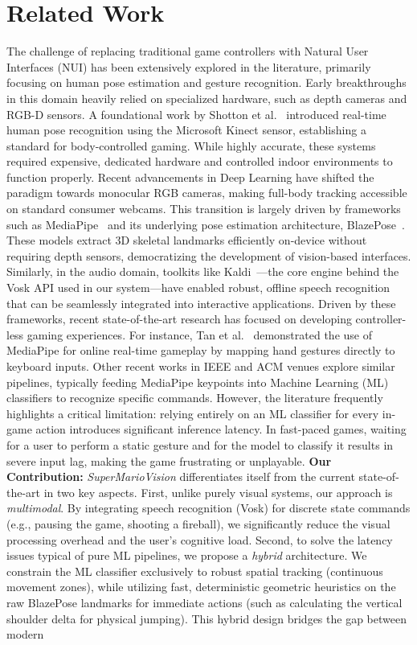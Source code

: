 \documentclass[10pt,twocolumn,a4paper]{article}
\begin{document}
	
	\section{Related Work}
	
	The challenge of replacing traditional game controllers with Natural User Interfaces (NUI) has been extensively explored in the literature, primarily focusing on human pose estimation and gesture recognition. Early breakthroughs in this domain heavily relied on specialized hardware, such as depth cameras and RGB-D sensors. A foundational work by Shotton et al.~\cite{shotton2011kinect} introduced real-time human pose recognition using the Microsoft Kinect sensor, establishing a standard for body-controlled gaming. While highly accurate, these systems required expensive, dedicated hardware and controlled indoor environments to function properly. Recent advancements in Deep Learning have shifted the paradigm towards monocular RGB cameras, making full-body tracking accessible on standard consumer webcams. This transition is largely driven by frameworks such as MediaPipe~\cite{lugaresi2019mediapipe} and its underlying pose estimation architecture, BlazePose~\cite{bazarevsky2020blazepose}. These models extract 3D skeletal landmarks efficiently on-device without requiring depth sensors, democratizing the development of vision-based interfaces. Similarly, in the audio domain, toolkits like Kaldi~\cite{povey2011kaldi}---the core engine behind the Vosk API used in our system---have enabled robust, offline speech recognition that can be seamlessly integrated into interactive applications. Driven by these frameworks, recent state-of-the-art research has focused on developing controller-less gaming experiences. For instance, Tan et al.~\cite{tan2022gesture} demonstrated the use of MediaPipe for online real-time gameplay by mapping hand gestures directly to keyboard inputs. Other recent works in IEEE and ACM venues explore similar pipelines, typically feeding MediaPipe keypoints into Machine Learning (ML) classifiers to recognize specific commands. However, the literature frequently highlights a critical limitation: relying entirely on an ML classifier for every in-game action introduces significant inference latency. In fast-paced games, waiting for a user to perform a static gesture and for the model to classify it results in severe input lag, making the game frustrating or unplayable. \textbf{Our Contribution:} \textit{SuperMarioVision} differentiates itself from the current state-of-the-art in two key aspects. First, unlike purely visual systems, our approach is \textit{multimodal}. By integrating speech recognition (Vosk) for discrete state commands (e.g., pausing the game, shooting a fireball), we significantly reduce the visual processing overhead and the user's cognitive load. Second, to solve the latency issues typical of pure ML pipelines, we propose a \textit{hybrid} architecture. We constrain the ML classifier exclusively to robust spatial tracking (continuous movement zones), while utilizing fast, deterministic geometric heuristics on the raw BlazePose landmarks for immediate actions (such as calculating the vertical shoulder delta for physical jumping). This hybrid design bridges the gap between modern 
\end{document}
